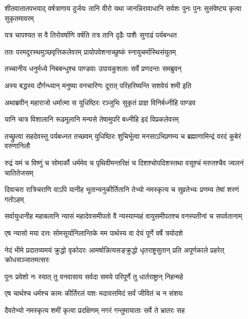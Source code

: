 \threelineshloka
{शीतवातातपभयाद् वर्षत्राणाय दुर्जयः}
{तानि वीरो यथा जानन्निरावाधानि सर्वशः}
{पुनः पुनः सुसंवेष्ट्य कृत्वा सुकृतमावरम्}


\twolineshloka
{यत्र चापश्यत स वै तिरोवर्षाणि वर्षति}
{तत्र तानि दृढैः पाशैः सुगाढं पर्यबन्धत}


\twolineshloka
{ततः परमदूरस्थमुञ्छवृत्तिकलेवरम्}
{प्रायोपवेशनाच्छुष्कं स्नायुचर्मास्थिसंयुतम्}


\twolineshloka
{तच्चानीय धनुर्मध्ये निबबन्धुश्च पाण्डवाः}
{उपायकुशलाः सर्वे प्रणदन्तः समब्रुवन्}


\twolineshloka
{अस्य बद्धस्य दौर्गन्ध्यान् मनुष्या वनचारिणः}
{दूरात् परिहरिष्यन्ति सशवेयं शमी इति}


\twolineshloka
{अथाब्रवीन् महाराजो धर्मात्मा स युधिष्ठिरः}
{रञ्जुभिः सुकृतं प्राज्ञ विनिर्बध्नीहि पाण्डव}


\twolineshloka
{यानि चात्र विशालानि रूढमूलानि मन्यसे}
{तेषामुपरि बध्नीहि इदं विप्रकलेवरम्}



\onelineshloka
{तच्छ्रुत्वा सहदेवस्तु पर्यबध्नत तच्छवम्}
\twolineshloka
{युधिष्ठिरः शुचिर्भूत्वा मनसाऽभिप्रणम्य च}
{ब्रह्माणामिन्द्रं वरदं कुबेरं वरुणानिलौ}


\threelineshloka
{रुद्रं यमं च विष्णुं च सोमार्कौ धर्ममेव च}
{पृथिवीमन्तरिक्षं च दिशश्चोपदिशस्तथा}
{वसूश्चं मरुतश्चैव ज्वलनं चातितेजसम्}


\fourlineindentedshloka
{दिवाचरा रात्रिचराणि वाऽपि}
{यानीह भूतान्यनुकीर्तितानि}
{तेभ्यो नमस्कृत्य च सुव्रतेभ्यः}
{प्रणम्य तेषां शरणं गतोऽहम्}


\fourlineindentedshloka
{सर्वायुधानीह महाबलानि}
{न्यासं महादेवसमीपतो वै}
{न्यस्याम्यहं वायुसमीपतश्च}
{वनस्पतीनां च सपर्वतानाम्}


\twolineshloka
{एष न्यासो मया दत्तः सोमसूर्यानिलान्तिके}
{मम पार्थस्य वा देयं पूर्णे वर्षे त्रयोदशे}


\threelineshloka
{नेदं भीमे प्रदातव्यमयं क्रुद्धो वृकोदरः}
{आमर्षान्नित्यसङ्क्रुद्धो धृतराष्ट्रसुतान् प्रति}
{अपूर्णकाले प्रहरेत् क्रोधसञ्जातमत्सरः}


\twolineshloka
{पुनः प्रवेशो नः स्यात् तु वनवासाय सर्वदा}
{समये परिपूर्णे तु धार्तराष्ट्रान् निहन्महे}


\twolineshloka
{एष चार्थश्च धर्मश्च कामः कीर्तिरलं यशः}
{मदायत्तमिदं सर्वं जीवितं च न संशयः}



\twolineshloka
{दैवतेभ्यो नमस्कृत्य शमीं कृत्वा प्रदक्षिणम्}
{नगरं गन्तुमायाताः सर्वे ते भ्रातरः सह}


